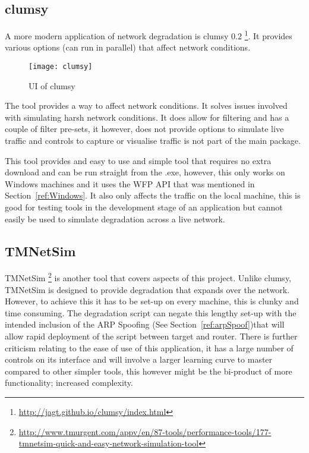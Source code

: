 \subsection{clumsy}
A more modern application of network degradation is clumsy 0.2 \footnote{\url{http://jagt.github.io/clumsy/index.html}}. It provides various options (can run in parallel) that affect network conditions. 

\begin{wrapfigure}{r}{5cm}
\begin{center}
	\texttt{[image: clumsy]}
	\caption{UI of clumsy}
\end{center}
\end{wrapfigure}

The tool provides a way to affect network conditions. It solves issues involved with simulating harsh network conditions. It does allow for filtering and has a couple of filter pre-sets, it however, does not provide options to simulate live traffic and controls to capture or visualise traffic is not part of the main package.

This tool provides and easy to use and simple tool that requires no extra download and can be run straight from the .exe, however, this only works on Windows machines and it uses the WFP API that was mentioned in Section~\ref{ref:Windows}. It also only affects the traffic on the local machine, this is good for testing tools in the development stage of an application but cannot easily be used to simulate degradation across a live network.

\subsection{TMNetSim}
TMNetSim \footnote{\url{http://www.tmurgent.com/appv/en/87-tools/performance-tools/177-tmnetsim-quick-and-easy-network-simulation-tool}} is another tool that covers aspects of this project. Unlike clumsy, TMNetSim is designed to provide degradation that expands over the network. However, to achieve this it has to be set-up on every machine, this is clunky and time consuming. The degradation script can negate this lengthy set-up with the intended inclusion of the ARP Spoofing (See Section~\ref{ref:arpSpoof})that will allow rapid deployment of the script between target and router. There is further criticism relating to the ease of use of this application, it has a large number of controls on its interface and will involve a larger learning curve to master compared to other simpler tools, this however might be the bi-product of more functionality; increased complexity.

